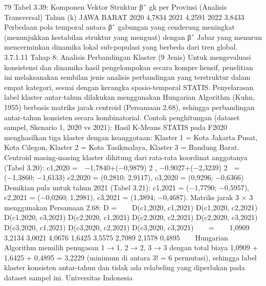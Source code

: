 79
Tabel 3.39: Komponen Vektor Struktur β˜
gk per Provinsi (Analisis Transversal)
Tahun (k) JAWA BARAT
2020 4,7834
2021 4,2591
2022 3,8433
Perbedaan pola temporal antara β˜ gabungan yang cenderung meningkat (menunjukkan
kestabilan struktur yang menguat) dengan β˜
Jabar yang menurun mencerminkan dinamika
lokal sub-populasi yang berbeda dari tren global.
3.7.1.11 Tahap 8: Analisis Perbandingan Klaster (9 Jenis)
Untuk mengevaluasi konsistensi dan dinamika hasil pengelompokan secara komprehensif, penelitian ini melaksanakan sembilan jenis analisis perbandingan yang terstruktur
dalam empat kategori, sesuai dengan kerangka spasio-temporal STATIS. Penyelarasan
label klaster antar-tahun dilakukan menggunakan Hungarian Algorithm (Kuhn, 1955)
berbasis matriks jarak centroid (Persamaan 2.68), sehingga perbandingan antar-tahun
konsisten secara kombinatorial.
Contoh penghitungan (dataset sampel, Skenario 1, 2020 vs 2021): Hasil K-Means STATIS
pada F2020 menghasilkan tiga klaster dengan keanggotaan: Klaster 1 = {Kota Jakarta Pusat,
Kota Cilegon}, Klaster 2 = {Kota Tasikmalaya}, Klaster 3 = {Bandung Barat}. Centroid
masing-masing klaster dihitung dari rata-rata koordinat anggotanya (Tabel 3.20):
c1,2020 =

−1,7840+(−0,9879)
2
,
−0,9027+(−2,3239)
2

= (−1,3860; −1,6133)
c2,2020 = (0,2810; 2,9117), c3,2020 = (0,9296; −0,6366)
Demikian pula untuk tahun 2021 (Tabel 3.21): c1,2021 = (−1,7790; −0,5957), c2,2021 =
(−0,0260; 1,2981), c3,2021 = (1,3894; −0,4687). Matriks jarak 3 × 3 menggunakan
Persamaan 2.68:
D =


D(c1,2020, c1,2021) D(c1,2020, c2,2021) D(c1,2020, c3,2021)
D(c2,2020, c1,2021) D(c2,2020, c2,2021) D(c2,2020, c3,2021)
D(c3,2020, c1,2021) D(c3,2020, c2,2021) D(c3,2020, c3,2021)

 =


1,0909 3,2134 3,0021
4,0676 1,6425 3,5575
2,7089 2,1578 0,4895


Hungarian Algorithm memilih penugasan {1 → 1, 2 → 2, 3 → 3} dengan total biaya
1,0909 + 1,6425 + 0,4895 = 3,2229 (minimum di antara 3! = 6 permutasi), sehingga label
klaster konsisten antar-tahun dan tidak ada relabeling yang diperlukan pada dataset sampel
ini.
Universitas Indonesia

